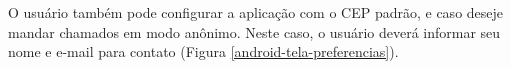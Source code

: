 \documentclass[
	article,			%
	11pt,				%
	oneside,			%
	a4paper,			%
	english,			%
	brazil,				%
	sumario=tradicional
	]{abntex2}
\begin{document}
\begin{figure}[!htbp]
\begin{minipage}{0.4\textwidth}
  \end{minipage}
\end{figure}

O usuário também pode configurar a aplicação com o CEP padrão, e caso deseje mandar chamados em modo anônimo. Neste caso, o usuário deverá informar seu nome e e-mail para contato (Figura \ref{android-tela-preferencias}).
\end{document}
